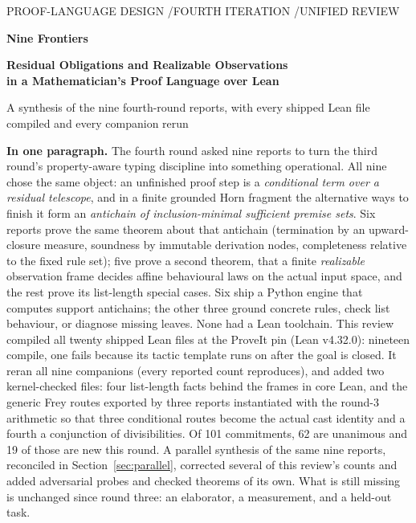 \documentclass[11pt,a4paper]{article}
\theoremstyle{definition}
\theoremstyle{plain}
\begin{document}
\begin{titlepage}
\vspace*{8mm}
{\sffamily\small\color{muted}PROOF-LANGUAGE DESIGN \quad/\quad FOURTH ITERATION \quad/\quad UNIFIED REVIEW\par}
\vspace{14mm}
{\sffamily\bfseries\color{ink}\fontsize{30}{36}\selectfont Nine Frontiers\par}
\vspace{5mm}
{\sffamily\bfseries\color{ink}\fontsize{19}{24}\selectfont Residual Obligations and Realizable Observations\\in a Mathematician's Proof Language over Lean\par}
\vspace{8mm}
{\sffamily\large A synthesis of the nine fourth-round reports, with every shipped Lean file compiled and every companion rerun\par}
\vspace{12mm}
\begin{keybox}
\textbf{In one paragraph.} The fourth round asked nine reports to turn the third round's property-aware typing discipline into something operational. All nine chose the same object: an unfinished proof step is a \emph{conditional term over a residual telescope}, and in a finite grounded Horn fragment the alternative ways to finish it form an \emph{antichain of inclusion-minimal sufficient premise sets}. Six reports prove the same theorem about that antichain (termination by an upward-closure measure, soundness by immutable derivation nodes, completeness relative to the fixed rule set); five prove a second theorem, that a finite \emph{realizable} observation frame decides affine behavioural laws on the actual input space, and the rest prove its list-length special cases. Six ship a Python engine that computes support antichains; the other three ground concrete rules, check list behaviour, or diagnose missing leaves. None had a Lean toolchain. This review compiled all twenty shipped Lean files at the ProveIt pin (Lean v4.32.0): nineteen compile, one fails because its tactic template runs on after the goal is closed. It reran all nine companions (every reported count reproduces), and added two kernel-checked files: four list-length facts behind the frames in core Lean, and the generic Frey routes exported by three reports instantiated with the round-3 arithmetic so that three conditional routes become the actual cast identity and a fourth a conjunction of divisibilities. Of 101 commitments, 62 are unanimous and 19 of those are new this round. A parallel synthesis of the same nine reports, reconciled in Section~\ref{sec:parallel}, corrected several of this review's counts and added adversarial probes and checked theorems of its own. What is still missing is unchanged since round three: an elaborator, a measurement, and a held-out task.

\end{keybox}
\end{titlepage}
\end{document}
